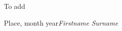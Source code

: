 %
%

\foreword

To add

\vspace{\baselineskip}
\begin{flushright}\noindent
Place, month year\hfill {\it Firstname  Surname}\\
\end{flushright}


